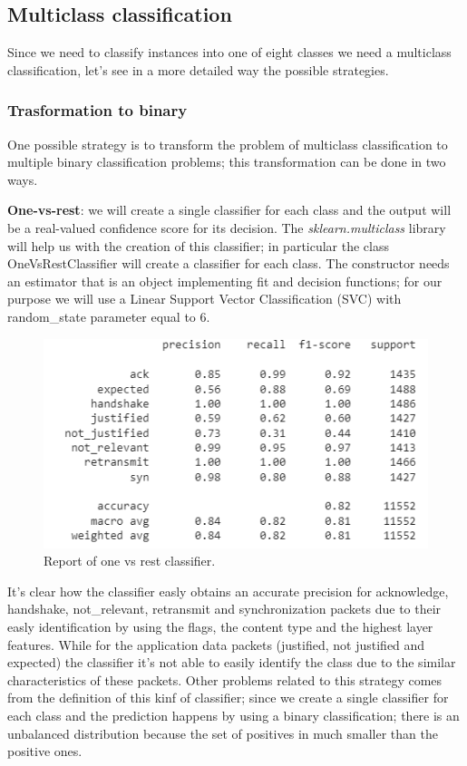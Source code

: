 \documentclass[sigconf]{acmart}
\begin{document}
    \subsection{Multiclass classification}
    Since we need to classify instances into one of eight classes we need a multiclass classification, let's see in a more detailed way the possible strategies.

    \subsubsection{Trasformation to binary}
    One possible strategy is to transform the problem of multiclass classification to multiple binary classification problems; this transformation can be done in two ways.

    \textbf{One-vs-rest}: we will create a single classifier for each class and the output will be a real-valued confidence score for its decision. The \textit{sklearn.multiclass} library will help us with the creation of this classifier; in particular the class OneVsRestClassifier will create a classifier for each class. The constructor needs an estimator that is an object implementing fit and decision functions; for our purpose we will use a Linear Support Vector Classification (SVC) with random\_state parameter equal to 6.
    \begin{figure}[h!]
        \includegraphics[width=\linewidth]{img/one_vs_rest_classifier.png}
        \caption{Report of one vs rest classifier.}
        \label{fig:one_vs_rest_classifier}
    \end{figure}
    It's clear how the classifier easly obtains an accurate precision for acknowledge, handshake, not\_relevant, retransmit and synchronization packets due to their easly identification by using the flags, the content type and the highest layer features. While for the application data packets (justified, not justified and expected) the classifier it's not able to easily identify the class due to the similar characteristics of these packets. Other problems related to this strategy comes from the definition of this kinf of classifier; since we create a single classifier for each class and the prediction happens by using a binary classification; there is an unbalanced distribution because the set of positives in much smaller than the positive ones.
\end{document}
